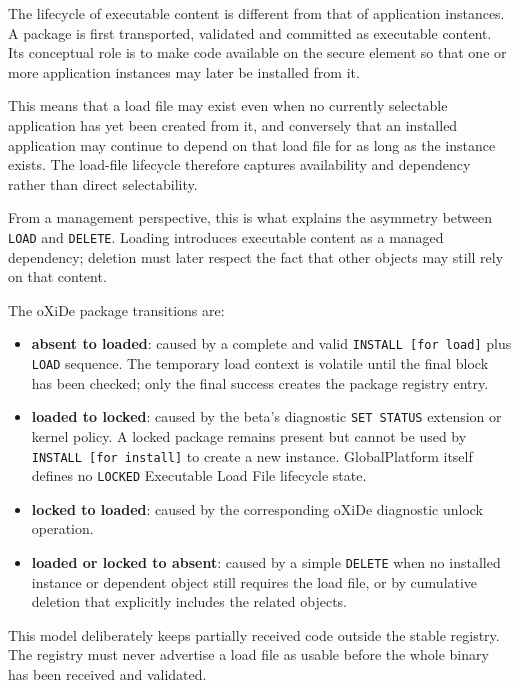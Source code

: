 
The lifecycle of executable content is different from that of application
instances. A package is first transported, validated and committed as executable
content. Its conceptual role is to make code available on the secure element so
that one or more application instances may later be installed from it.

This means that a load file may exist even when no currently selectable
application has yet been created from it, and conversely that an
installed application may continue to depend on that load file for as
long as the instance exists. The load-file lifecycle therefore captures
availability and dependency rather than direct selectability.

From a management perspective, this is what explains the asymmetry
between \texttt{LOAD} and \texttt{DELETE}. Loading introduces executable
content as a managed dependency; deletion must later respect the fact
that other objects may still rely on that content.

The oXiDe package transitions are:

\begin{itemize}
\item \textbf{absent to loaded}: caused by a complete and valid
  \texttt{INSTALL [for load]} plus \texttt{LOAD} sequence. The temporary load
  context is volatile until the final block has been checked; only the final
  success creates the package registry entry.
\item \textbf{loaded to locked}: caused by the beta's diagnostic
  \texttt{SET STATUS} extension or kernel policy. A locked package remains
  present but cannot be used by \texttt{INSTALL [for install]} to create a new
  instance. GlobalPlatform itself defines no \texttt{LOCKED} Executable Load
  File lifecycle state.
\item \textbf{locked to loaded}: caused by the corresponding oXiDe diagnostic
  unlock operation.
\item \textbf{loaded or locked to absent}: caused by a simple \texttt{DELETE}
  when no installed instance or dependent object still requires the load file,
  or by cumulative deletion that explicitly includes the related objects.
\end{itemize}

This model deliberately keeps partially received code outside the stable
registry. The registry must never advertise a load file as usable before the
whole binary has been received and validated.

